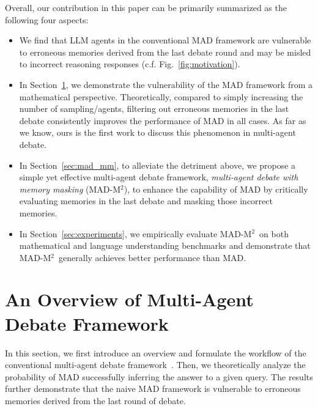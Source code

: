 \documentclass{article} %
\newcommand{\methodname}{MAD-M$^2$}
\theoremstyle{plain}
\begin{document}
Overall, our contribution in this paper can be primarily summarized as the following four aspects: 
\vspace{-5pt}
\begin{itemize}[leftmargin=.1in]
\setlength{\itemsep}{-0.05em}
\item We find that LLM agents in the conventional MAD framework are vulnerable to erroneous memories derived from the last debate round and may be misled to incorrect reasoning responses (c.f. Fig.~\ref{fig:motivation}). 
\item In Section~\ref{section:overview_mad}, we demonstrate the vulnerability of the MAD framework from a mathematical perspective. Theoretically, compared to simply increasing the number of sampling/agents, filtering out erroneous memories in the last debate consistently improves the performance of MAD in all cases. As far as we know, ours is the first work to discuss this phenomenon in multi-agent debate.
\item In Section~\ref{sec:mad_mm}, to alleviate the detriment above, we propose a simple yet effective multi-agent debate framework, \textit{multi-agent debate with memory masking} (\methodname), to enhance the capability of MAD by critically evaluating memories in the last debate and masking those incorrect memories.
\item In Section~\ref{sec:experiments}, we empirically evaluate \methodname\ on both mathematical and language understanding benchmarks and demonstrate that \methodname\ generally achieves better performance than MAD. %
\end{itemize}



\vspace{-8pt}
\section{An Overview of Multi-Agent Debate Framework}
\label{section:overview_mad}
\vspace{-6pt}
In this section, we first introduce an overview and formulate the workflow of the conventional multi-agent debate framework~\citep{mad_yilun}. Then, we theoretically analyze the probability of MAD successfully inferring the answer to a given query. The results further demonstrate that the naive MAD framework is vulnerable to erroneous memories derived from the last round of debate.
\end{document}
